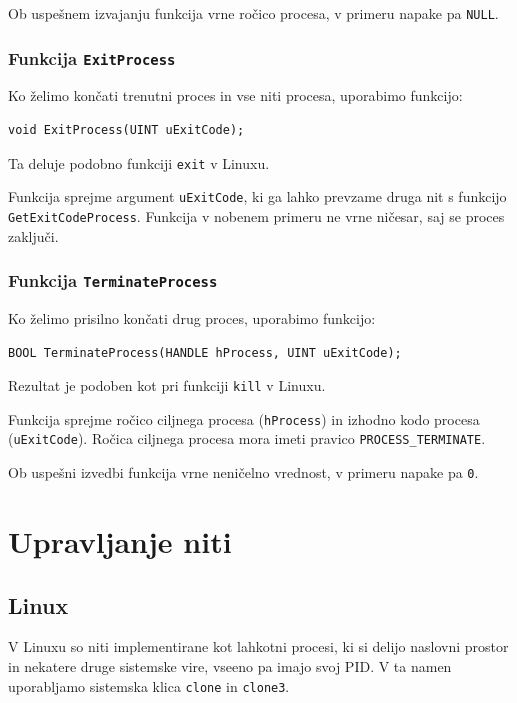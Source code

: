 \documentclass[a4paper,12pt,openright]{book}
\begin{document}
Ob uspešnem izvajanju funkcija vrne ročico procesa, v primeru napake pa \texttt{NULL}.

\subsubsection{Funkcija \texttt{ExitProcess}}

Ko želimo končati trenutni proces in vse niti procesa, uporabimo funkcijo:
\begin{lstlisting}[style=func]
 void ExitProcess(UINT uExitCode);
\end{lstlisting}
Ta deluje podobno funkciji \texttt{exit} v Linuxu.

Funkcija sprejme argument \texttt{uExitCode}, ki ga lahko prevzame druga nit s funkcijo \texttt{GetExitCodeProcess}.
Funkcija v nobenem primeru ne vrne ničesar, saj se proces zaključi.

\subsubsection{Funkcija \texttt{TerminateProcess}}

Ko želimo prisilno končati drug proces, uporabimo funkcijo:
\begin{lstlisting}[style=func]
 BOOL TerminateProcess(HANDLE hProcess, UINT uExitCode);
\end{lstlisting}
Rezultat je podoben kot pri funkciji \texttt{kill} v Linuxu.

Funkcija sprejme ročico ciljnega procesa (\texttt{hProcess}) in izhodno kodo procesa (\texttt{uExitCode}).
Ročica ciljnega procesa mora imeti pravico \texttt{PROCESS\-\_TERMINATE}.

Ob uspešni izvedbi funkcija vrne neničelno vrednost, v primeru napake pa \texttt{0}.

\section{Upravljanje niti} \label{sec:threads}

\subsection{Linux} \label{ssec:linux_syscalls:threads}

V Linuxu so niti implementirane kot lahkotni procesi, ki si delijo naslovni prostor in nekatere druge sistemske vire, vseeno pa imajo svoj PID.
V ta namen uporabljamo sistemska klica \texttt{clone} in \texttt{clone3}.
\end{document}

